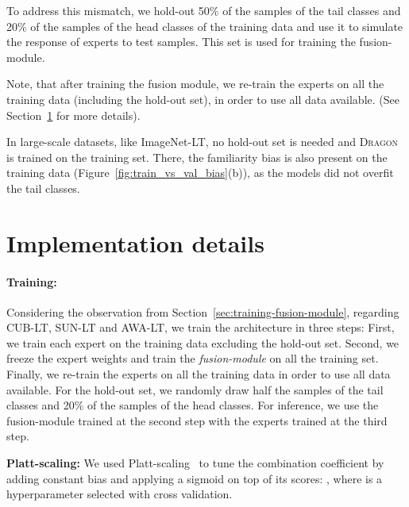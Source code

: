 \documentclass[10pt,twocolumn,letterpaper]{article}
\newcommand{\secref}[1]{Section~\ref{#1}}
\newcommand{\figref}[1]{Figure~\ref{#1}}
\newcommand{\DRAGON}{\textsc{Dragon}}
\begin{document}
To address this mismatch, we hold-out 50\% of the samples of the tail classes and 20\% of the samples of the head classes of the training data and use it to simulate the response of experts to test samples. This set is used for training the fusion-module.

Note, that after training the fusion module, we re-train the experts on all the training data (including the hold-out set), in order to use all data available. (See \secref{sec:implemntation} for more details).

In large-scale datasets, like ImageNet-LT, no hold-out set is needed and \DRAGON{} is trained on the training set. There,  the familiarity bias is also present on the training data (\figref{fig:train_vs_val_bias}(b)), as the models did not overfit the tail classes.

\section{Implementation details}
\label{sec:implemntation}

\paragraph{Training:} Considering the observation from \secref{sec:training-fusion-module}, regarding CUB-LT, SUN-LT and AWA-LT, we train the architecture in three steps: 
First, we train each expert on the training data excluding the hold-out set. Second, we freeze the expert weights and train the \textit{fusion-module} on all the training set. Finally, we re-train the experts on all the training data in order to use all data available.
For the hold-out set, we randomly draw half the samples of the tail classes and 20\% of the samples of the head classes.
For inference, we use the fusion-module trained at the second step with the experts trained at the third step.  

\noindent\textbf{Platt-scaling:}
We used Platt-scaling~\cite{Platt99} to tune the combination coefficient  by adding constant bias  and applying a sigmoid on top of its scores:
, where 
 is a hyperparameter selected with cross validation.
\end{document}
